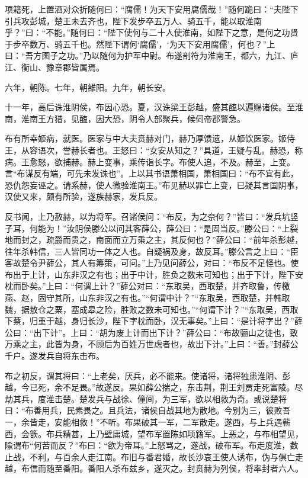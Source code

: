 \documentclass[]{article}
\begin{document}
项籍死，上置酒对众折随何曰：``腐儒！为天下安用腐儒哉！''随何跪曰：``夫陛下引兵攻彭城，楚王未去齐也，陛下发步卒五万人、骑五千，能以取淮南乎？''曰：``不能。''随何曰：``陛下使何与二十人使淮南，如陛下之意，是何之功贤于步卒数万、骑五千也。然陛下谓何`腐儒'，`为天下安用腐儒'，何也？''上曰：``吾方图子之功。''乃以随何为护军中尉。布遂剖符为淮南王，都六，九江、庐江、衡山、豫章郡皆属焉。

六年，朝陈。七年，朝雒阳。九年，朝长安。

十一年，高后诛淮阴侯，布因心恐。夏，汉诛梁王彭越，盛其醢以遍赐诸侯。至淮南，淮南王方猎，见醢，因大恐，阴令人部聚兵，候伺帝郡警急。

布有所幸姬病，就医。医家与中大夫贲赫对门，赫乃厚馈遗，从姬饮医家。姬侍王，从容语次，誉赫长者也。王怒曰：``女安从知之？''具道，王疑与乱。赫恐，称病。王愈怒，欲捕赫。赫上变事，乘传诣长字。布使人追，不及。赫至，上变。言``布谋反有端，可先未发诛也''。上以其书语萧相国，萧相国曰：``布不宜有此，恐仇怨妄诬之。请系赫，使人微验淮南王。''布见赫以罪亡上变，已疑其言国阴事，汉使又来，颇有所验，遂族赫家，发兵反。

反书闻，上乃赦赫，以为将军。召诸侯问：``布反，为之奈何？''皆曰：``发兵坑竖子耳，何能为！''汝阴侯滕公以问其客薛公，薛公曰：``是固当反。''滕公曰：``上裂地而封之，疏爵而贵之，南面而立万乘之主，其反何也？''薛公曰：``前年杀彭越，往年杀韩信，三人皆同功一体之人也。自疑祸及身，故反耳。''滕公言之上曰：``臣客故楚令尹薛公，其人有筹策，可问。''上乃见问薛公，对曰：``布反不足怪也。使布出于上计，山东非汉之有也；出于中计，胜负之数未可知也；出于下计，陛下安枕而卧矣。''上曰：``何谓上计？''薛公对曰：``东取吴，西取楚，并齐取鲁，传檄燕、赵，固守其所，山东非汉之有也。''``何谓中计？''``东取吴，西取楚，并韩取魏，据敖仓之粟，塞成皋之险，胜败之数未可知也。''``何谓下计？''``东取吴，西取下蔡，归重于越，身归长沙，陛下字枕而卧，汉无事矣。''上曰：``是计将字出？''薛公曰：``出下计''。上曰：``胡为废上计而出下计？''薛公曰：``布故骊山之徒也，致万乘之主，此皆为身，不顾后为百姓万世虑者也，故出下计。''上曰：``善。''封薛公千户。遂发兵自将东击布。

布之初反，谓其将曰：``上老矣，厌兵，必不能来。使诸将，诸将独患淮阴、彭越，今已死，余不足畏。''故遂反。果如薛公揣之，东击荆，荆王刘贾走死富陵。尽劫其兵，度淮击楚。楚发兵与战徐、僮间，为三军，欲以相救为奇。或说楚将曰：``布善用兵，民素畏之。且兵法，诸侯自战其地为散地。今别为三，彼败吾一，余皆走，安能相救！''不听。布果破其一军，二军散走。遂西，与上兵遇蕲西，会篏。布兵精甚，上乃壁庸城，望布军置陈如项籍军。上恶之，与布相望见，隃谓布``何苦而反？''布曰：``欲为帝耳。''上怒骂之，遂战，破布军。布走度淮，数止战，不利，与百余人走江南。布旧与番君婚，故长沙哀王使人诱布，伪与俱亡走越，布信而随至番阳。番阳人杀布兹乡，遂灭之。封贲赫为列侯，将率封者六人。
\end{document}
